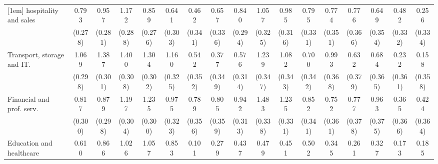 {\begin{tabular}{l*{16}{c}}
[1em]
hospitality and sales&       0.793\sym{**} &       0.957\sym{***}&       1.172\sym{***}&       0.859\sym{**} &       0.641\sym{*}  &       0.462         &       0.657         &       0.840\sym{**} &       1.057\sym{**} &       0.985\sym{**} &       0.795\sym{*}  &       0.774\sym{*}  &       0.776\sym{*}  &       0.649         &       0.482         &       0.256         \\
                    &     (0.278)         &     (0.281)         &     (0.288)         &     (0.276)         &     (0.303)         &     (0.341)         &     (0.336)         &     (0.294)         &     (0.325)         &     (0.316)         &     (0.331)         &     (0.351)         &     (0.366)         &     (0.354)         &     (0.332)         &     (0.334)         \\
[1em]
Transport, storage and IT.&       1.069\sym{***}&       1.387\sym{***}&       1.400\sym{***}&       1.304\sym{***}&       1.160\sym{***}&       0.542         &       0.377         &       0.576         &       1.239\sym{***}&       1.082\sym{**} &       0.700\sym{*}  &       0.993\sym{**} &       0.632         &       0.684         &       0.232         &       0.158         \\
                    &     (0.298)         &     (0.301)         &     (0.308)         &     (0.302)         &     (0.325)         &     (0.352)         &     (0.349)         &     (0.314)         &     (0.347)         &     (0.343)         &     (0.342)         &     (0.368)         &     (0.379)         &     (0.365)         &     (0.361)         &     (0.358)         \\
[1em]
Financial and prof. serv.&       0.817\sym{**} &       0.879\sym{**} &       1.197\sym{***}&       1.235\sym{***}&       0.975\sym{**} &       0.789\sym{*}  &       0.805\sym{*}  &       0.942\sym{**} &       1.483\sym{***}&       1.235\sym{***}&       0.852\sym{*}  &       0.752\sym{*}  &       0.777\sym{*}  &       0.963\sym{*}  &       0.365         &       0.424         \\
                    &     (0.300)         &     (0.298)         &     (0.304)         &     (0.300)         &     (0.323)         &     (0.356)         &     (0.359)         &     (0.313)         &     (0.338)         &     (0.331)         &     (0.341)         &     (0.361)         &     (0.378)         &     (0.375)         &     (0.366)         &     (0.364)         \\
[1em]
Education and healthcare&       0.610         &       0.866\sym{**} &       1.026\sym{**} &       1.057\sym{**} &       0.853\sym{*}  &       0.101         &       0.279         &       0.437         &       0.479         &       0.451         &       0.502         &       0.345         &       0.261         &       0.327         &       0.173         &       0.185         \\

\end{tabular}}

